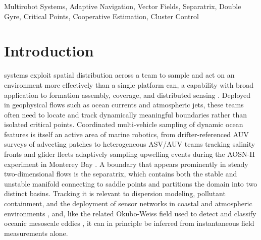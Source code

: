 \documentclass[lettersize,journal]{IEEEtran}
\begin{document}
\begin{IEEEkeywords}
Multirobot Systems, Adaptive Navigation, Vector Fields, Separatrix,
Double Gyre, Critical Points, Cooperative Estimation, Cluster Control
\end{IEEEkeywords}


\section{Introduction}
\label{sec:intro}

 systems exploit spatial distribution across a team to sample
and act on an environment more effectively than a single platform can, a
capability with broad application to formation assembly, coverage, and
distributed sensing \cite{1}. Deployed in geophysical flows such as ocean
currents and atmospheric jets, these teams often need to locate and track
dynamically meaningful boundaries rather than isolated critical points.
Coordinated multi-vehicle sampling of dynamic ocean features is itself an
active area of marine robotics, from drifter-referenced AUV surveys of
advecting patches \cite{2} to heterogeneous ASV/AUV teams tracking salinity
fronts \cite{3} and glider fleets adaptively sampling upwelling events during
the AOSN-II experiment in Monterey Bay \cite{4}. A boundary that appears
prominently in steady two-dimensional flows is the separatrix, which
contains both the stable and unstable manifold connecting to saddle
points and partitions the domain into two distinct basins. Tracking it
is relevant to dispersion modeling, pollutant containment, and the
deployment of sensor networks in coastal and atmospheric environments
\cite{6,7,8}, and, like the related Okubo-Weiss field used to detect and
classify oceanic mesoscale eddies \cite{5}, it can in principle be inferred
from instantaneous field measurements alone.
\end{document}
